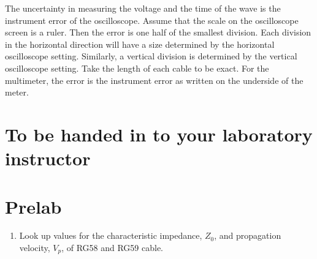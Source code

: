 The uncertainty in measuring the voltage and the time of the wave is the instrument error of the oscilloscope. Assume that the scale on the oscilloscope screen is a ruler. Then the error is one half of the smallest division. Each division in the horizontal direction will have a size determined by the horizontal oscilloscope setting. Similarly, a vertical division is determined by the vertical oscilloscope setting. Take the length of each cable to be exact. For the multimeter, the error is the instrument error as written on the underside of the meter. 

\section{To be handed in to your laboratory instructor}

\section{Prelab}
\begin{enumerate}

\item Look up values for the characteristic impedance, $Z_0$, and propagation velocity, $V_p$, of RG58 and RG59 cable.

\end{enumerate}

